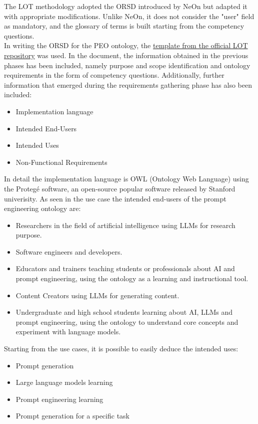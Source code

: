 The LOT methodology adopted the ORSD introduced by NeOn but adapted it with appropriate modifications. Unlike NeOn, it does not consider the "user" field as mandatory, and the glossary of terms is built starting from the competency questions.\\
In writing the ORSD for the PEO ontology, the \href{https://github.com/oeg-upm/LOT-resources/tree/master/templates%20for%20ORSD}{template from the official LOT repository}\cite{template_orsd} was used. 
In the document, the information obtained in the previous phases has been included, namely purpose and scope identification and ontology requirements in the form of competency questions. Additionally, further information that emerged during the requirements gathering phase has also been included:
\begin{itemize}
    \item Implementation language 
    \item Intended End-Users 
    \item Intended Uses
    \item Non-Functional Requirements
\end{itemize}
In detail the implementation language is OWL (Ontology Web Language) using the Protegé software\cite{protege_sw}, an open-source popular software released by Stanford univerisity. As seen in the use case the intended end-users of the prompt engineering ontology are:
\begin{itemize}
    \item Researchers in the field of artificial intelligence using LLMs for research purpose.
    \item Software engineers and developers.
    \item Educators and trainers teaching students or professionals about AI and prompt engineering, using the ontology as a learning and instructional tool.
    \item Content Creators using LLMs for generating content.
    \item Undergraduate and high school students learning about AI, LLMs and prompt engineering, using the ontology to understand core concepts and experiment with language models.
\end{itemize}
Starting from the use cases, it is possible to easily deduce the intended uses:
\begin{itemize}
    \item Prompt generation
    \item Large language models learning
    \item Prompt engineering learning
    \item Prompt generation for a specific task
\end{itemize}
